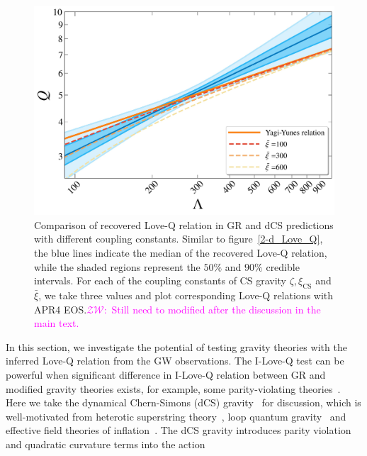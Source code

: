 \documentclass[a4paper,11pt]{article}
\newcommand{\ZW}[1]{\textcolor{magenta}{$\mathcal{ZW}$:~#1}}
\begin{document}
\begin{figure}[t]
\begin{minipage}{0.48\linewidth}
    \end{minipage}
    \vspace{3mm}
    \begin{minipage}{0.48\linewidth}
        \includegraphics[width=\linewidth]{CS_xi_bar_APR4_2d.pdf}
    \end{minipage}
    \caption{Comparison of recovered Love-Q relation in GR
    and dCS predictions 
    with different coupling constants. Similar to figure~\ref{2-d_Love_Q}, the
    blue lines indicate the median of the recovered Love-Q relation, while the
    shaded regions represent the $50\%$ and $90\%$ credible intervals. For each of the coupling constants of 
    CS gravity $\zeta, \xi_{\mathrm{CS}}$ and $\bar\xi$, we take three values
    and plot corresponding Love-Q relations with APR4 EOS.\ZW{Still need to
    modified after the discussion in the main text.}}
    \label{cs_Love_Q}
\end{figure}
In this section, we investigate the potential of testing gravity theories with the 
inferred Love-Q relation from the GW observations. The I-Love-Q test can be 
powerful when significant difference in I-Love-Q relation between GR and modified 
gravity theories exists, for example, some parity-violating theories~\cite{Yagi_2017, Yunes:2025xwp}. 
Here we take the dynamical Chern-Simons (dCS) gravity~\cite{Jackiw:2003pm, Smith:2007jm,Alexander:2009tp} for discussion, 
which is well-motivated from heterotic superstring theory~\cite{Polchinski:1998rq,
Polchinski:1998rr}, loop quantum gravity~\cite{Alexander:2004xd,Taveras:2008yf,
Calcagni:2009xz} and effective field theories of inflation~\cite{Weinberg:2008hq}. 
The dCS gravity introduces parity violation and quadratic curvature terms into the action~\cite{Alexander:2009tp,Gupta:2017vsl}
\end{document}
